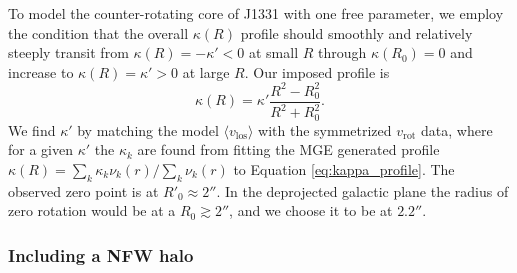 \documentclass[useAMS,usenatbib]{mnras}
\begin{document}
To model the counter-rotating core of J1331 with one free parameter, we employ the condition that the overall $\kappa(R)$ profile should smoothly and relatively steeply transit from $\kappa(R) = -\kappa' < 0$ at small $R$ through $\kappa(R_0) = 0$ and increase to $\kappa(R) = \kappa' > 0$ at large $R$. Our imposed profile is
\begin{equation}
\kappa(R) = \kappa' \frac{R^2 - R_0^2}{R^2 + R_0^2}. \label{eq:kappa_profile}
\end{equation}
We find $\kappa'$ by matching the model $\langle v_\text{los} \rangle$ with the symmetrized $v_\text{rot}$ data, where for a given $\kappa'$ the $\kappa_k$ are found from fitting the MGE generated profile $\kappa(R) = \sum_k \kappa_k \nu_k(r)/\sum_k \nu_k(r)$ to Equation \eqref{eq:kappa_profile}. The observed zero point is at $R'_0\approx 2''$. In the deprojected galactic plane the radius of zero rotation would be at a $R_0 \gtrsim 2''$, and we choose it to be at $2.2''$.

\subsubsection{Including a NFW halo} 
\end{document}
